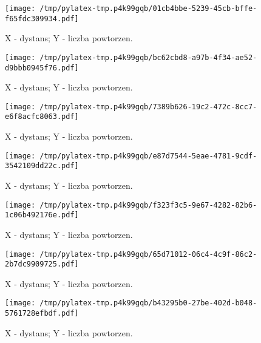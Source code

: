 \documentclass{article}%
\begin{document}
%
\newpage%


\begin{figure}[h]%
\centering%
\texttt{[image: /tmp/pylatex-tmp.p4k99gqb/01cb4bbe-5239-45cb-bffe-f65fdc309934.pdf]}%
\caption{X {-} dystans; Y {-} liczba powtorzen.}%
\end{figure}

%
\newpage%


\begin{figure}[h]%
\centering%
\texttt{[image: /tmp/pylatex-tmp.p4k99gqb/bc62cbd8-a97b-4f34-ae52-d9bbb0945f76.pdf]}%
\caption{X {-} dystans; Y {-} liczba powtorzen.}%
\end{figure}

%
\newpage%


\begin{figure}[h]%
\centering%
\texttt{[image: /tmp/pylatex-tmp.p4k99gqb/7389b626-19c2-472c-8cc7-e6f8acfc8063.pdf]}%
\caption{X {-} dystans; Y {-} liczba powtorzen.}%
\end{figure}

%
\newpage%


\begin{figure}[h]%
\centering%
\texttt{[image: /tmp/pylatex-tmp.p4k99gqb/e87d7544-5eae-4781-9cdf-3542109dd22c.pdf]}%
\caption{X {-} dystans; Y {-} liczba powtorzen.}%
\end{figure}

%
\newpage%


\begin{figure}[h]%
\centering%
\texttt{[image: /tmp/pylatex-tmp.p4k99gqb/f323f3c5-9e67-4282-82b6-1c06b492176e.pdf]}%
\caption{X {-} dystans; Y {-} liczba powtorzen.}%
\end{figure}

%
\newpage%


\begin{figure}[h]%
\centering%
\texttt{[image: /tmp/pylatex-tmp.p4k99gqb/65d71012-06c4-4c9f-86c2-2b7dc9909725.pdf]}%
\caption{X {-} dystans; Y {-} liczba powtorzen.}%
\end{figure}

%
\newpage%


\begin{figure}[h]%
\centering%
\texttt{[image: /tmp/pylatex-tmp.p4k99gqb/b43295b0-27be-402d-b048-5761728efbdf.pdf]}%
\caption{X {-} dystans; Y {-} liczba powtorzen.}%
\end{figure}

%
\newpage

%
\end{document}
